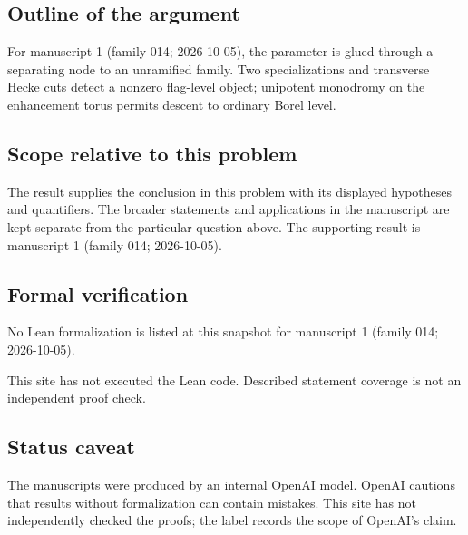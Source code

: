 \documentclass[11pt]{article}
\begin{document}
\subsection{Outline of the argument}
For manuscript 1 (family 014; 2026-10-05), the parameter is glued through a separating node to an unramified family. Two specializations and transverse Hecke cuts detect a nonzero flag-level object; unipotent monodromy on the enhancement torus permits descent to ordinary Borel level.

\subsection{Scope relative to this problem}
The result supplies the conclusion in this problem with its displayed hypotheses and quantifiers. The broader statements and applications in the manuscript are kept separate from the particular question above. The supporting result is manuscript 1 (family 014; 2026-10-05).

\subsection{Formal verification}
No Lean formalization is listed at this snapshot for manuscript 1 (family 014; 2026-10-05).

This site has not executed the Lean code. Described statement coverage is not an independent proof check.

\subsection{Status caveat}
The manuscripts were produced by an internal OpenAI model. OpenAI cautions that results without formalization can contain mistakes. This site has not independently checked the proofs; the label records the scope of OpenAI's claim.
\end{document}
